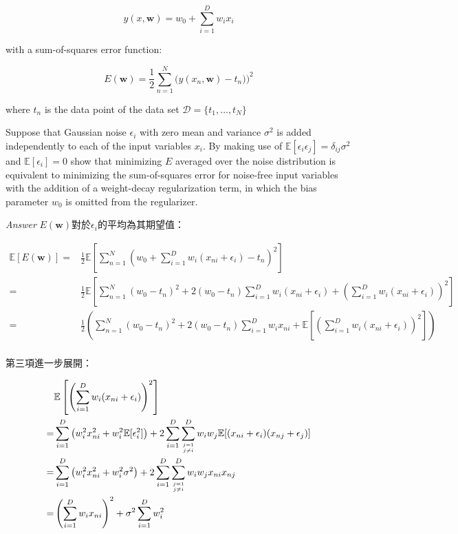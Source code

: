 \documentclass{article}
\begin{document}
\begin{equation*}
y(x, \mathbf w) = w_0 + \sum_{i=1}^{D}w_i x_i
\end{equation*}

with a sum-of-squares error function:

\begin{equation*}
E(\mathbf w) = \frac 1 2 \sum_{n=1}^{N} \big(y(x_n, \mathbf w) -t_n ) \big)^2
\end{equation*}

where $t_n$ is the data point of the data set $\mathcal D=\{t_1, \ldots,t_N \}$

Suppose that Gaussian noise $\epsilon_i$ with zero mean and variance $\sigma^2$ is added independently to each of the input variables $x_i$.
By making use of $\mathbb E[\epsilon_i \epsilon_j] = \delta_{ij} \sigma^2$ and $\mathbb E[\epsilon_i] = 0$ show that minimizing $E$ averaged over the noise distribution is equivalent to minimizing the sum-of-squares error for noise-free input variables with the addition of a weight-decay regularization term, in which the bias parameter $w_0$ is omitted from the regularizer.

\emph{Answer} $E(\mathbf w)$對於$\epsilon_i$的平均為其期望值：

\begin{equation}\label{expectation}
\begin{aligned}
\mathbb E[E(\mathbf w)]
=& \frac{1}{2}\mathbb E\left[\sum\limits_{n=1}^N \left(w_0+\sum\limits_{i=1}^D w_i(x_{ni}+\epsilon_i)-t_n\right)^2\right]\\
=& \frac{1}{2}\mathbb E\left[\sum\limits_{n=1}^N (w_0-t_n)^2+2(w_0-t_n)\sum\limits_{i=1}^D w_i(x_{ni}+\epsilon_i)+\left(\sum\limits_{i=1}^D w_i(x_{ni}+\epsilon_i)\right)^2\right]\\
=& \frac{1}{2}\left(\sum\limits_{n=1}^N (w_0-t_n)^2+2(w_0-t_n)\sum\limits_{i=1}^D w_i x_{ni}+\mathbb E\left[\left(\sum\limits_{i=1}^D w_i(x_{ni}+\epsilon_i)\right)^2\right]\right)\\
\end{aligned}
\end{equation}

第三項進一步展開：

\begin{equation}
\begin{aligned}
& \mathbb E\left[\left(\sum\limits_{i=1}^D w_i(x_{ni}+\epsilon_i)\right)^2\right]\\
=& \sum\limits_{i=1}^D \left(w_i^2 x_{ni}^2 + w_i^2 \mathbb E[\epsilon_i^2]\right) + 2\sum\limits_{i=1}^D \sum\limits_{\genfrac{}{}{0pt}{2}{j=1}{j\neq i}}^D w_i w_j \mathbb E[(x_{ni}+\epsilon_i)(x_{nj}+\epsilon_j)] \\
=& \sum\limits_{i=1}^D \left(w_i^2 x_{ni}^2 + w_i^2 \sigma^2\right) + 2\sum\limits_{i=1}^D \sum\limits_{\genfrac{}{}{0pt}{2}{j=1}{j\neq i}}^D w_i w_j x_{ni} x_{nj}\\
=& \left(\sum\limits_{i=1}^D w_i x_{ni}\right)^2 + \sigma^2\sum\limits_{i=1}^D w_i^2
\end{aligned}
\end{equation}
\end{document}
